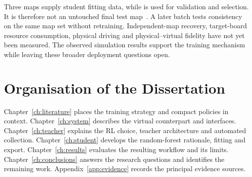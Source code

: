Three maps supply student fitting data, while  is used for
validation and selection. It is therefore not an untouched final test map~\cite{sklearnCV}.
A later batch tests consistency on the same map set without retraining. Independent-map
recovery, target-board resource consumption, physical driving and physical--virtual
fidelity have not yet been measured. The observed simulation results support the
training mechanism while leaving these broader deployment questions open.

\section{Organisation of the Dissertation}
Chapter~\ref{ch:literature} places the training strategy and compact policies in
context. Chapter~\ref{ch:system} describes the virtual counterpart and interfaces.
Chapter~\ref{ch:teacher} explains the RL choice, teacher architecture and automated
collection. Chapter~\ref{ch:student} develops the random-forest rationale, fitting
and export. Chapter~\ref{ch:results} evaluates the resulting workflow and its
limits. Chapter~\ref{ch:conclusions} answers the research questions and identifies
the remaining work. Appendix~\ref{app:evidence} records the principal evidence
sources.
